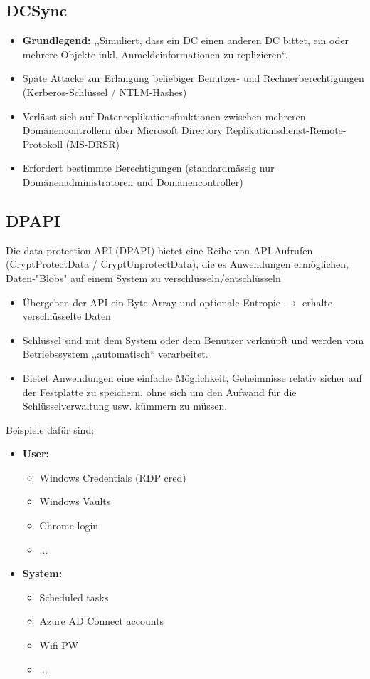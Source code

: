 \subsection{DCSync}
\begin{itemize}
    \item \textbf{Grundlegend:} ,,Simuliert, dass ein DC einen anderen DC bittet, ein oder mehrere Objekte inkl. Anmeldeinformationen zu replizieren``.
    \item Späte Attacke zur Erlangung beliebiger Benutzer- und Rechnerberechtigungen (Kerberos-Schlüssel / NTLM-Hashes)
    \item Verlässt sich auf Datenreplikationsfunktionen zwischen mehreren Domänencontrollern über Microsoft Directory Replikationsdienst-Remote-Protokoll (MS-DRSR)
    \item Erfordert bestimmte Berechtigungen (standardmässig nur Domänenadministratoren und Domänencontroller)
\end{itemize}

\subsection{DPAPI}
Die data protection API (DPAPI) bietet eine Reihe von API-Aufrufen (CryptProtectData / CryptUnprotectData), die es Anwendungen ermöglichen, Daten-"Blobs" auf einem System zu verschlüsseln/entschlüsseln
\begin{itemize}
    \item Übergeben der API ein Byte-Array und optionale Entropie $\rightarrow$  erhalte verschlüsselte Daten
    \item Schlüssel sind mit dem System oder dem Benutzer verknüpft und werden vom Betriebssystem ,,automatisch`` verarbeitet.
    \item Bietet Anwendungen eine einfache Möglichkeit, Geheimnisse relativ sicher auf der Festplatte zu speichern, ohne sich um den Aufwand für die Schlüsselverwaltung usw. kümmern zu müssen.
\end{itemize}

Beispiele dafür sind:
\begin{itemize}
    \item \textbf{User:}
    \begin{itemize}
        \item Windows Credentials (RDP cred)
        \item Windows Vaults
        \item Chrome login
        \item ...
    \end{itemize}
    \item \textbf{System:}
    \begin{itemize}
        \item Scheduled tasks
        \item Azure AD Connect accounts
        \item Wifi PW
        \item ...
    \end{itemize}
\end{itemize}

